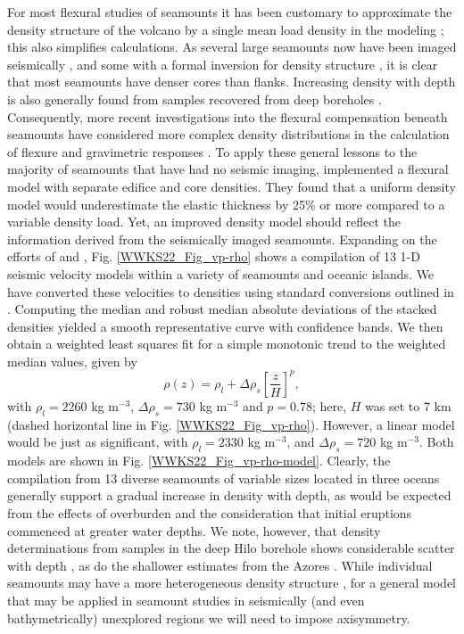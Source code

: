 For most flexural studies of seamounts it has been customary to approximate the density structure of the
volcano by a single mean load density in the modeling \citep[e.g.,~][]{WC74,WSSW06}; this also simplifies calculations.
As several large seamounts now have been imaged seismically \citep[e.g.,~][]{W1985,H1994,C1995,W1997,C1999,W1999,G2001,K2002,EMH05,C2009,W2021},
and some with a formal inversion for density structure \citep[e.g.,~][]{H1991}, it is clear that most seamounts have denser
cores than flanks.  Increasing density with depth is also generally found from samples recovered from deep boreholes
\citep[e.g.,~][]{JM2001,H1979}.
Consequently, more recent investigations into the flexural compensation beneath seamounts have considered more complex
density distributions in the calculation of flexure and gravimetric responses \citep[e.g.,~][]{C2009,W2021}. To apply
these general lessons to the majority of seamounts that have had no seismic imaging, \citet{KW2010} implemented a flexural
model with separate edifice and core densities. They found that a uniform density model would underestimate the elastic thickness
by 25\% or more compared to a variable density load.  Yet, an improved density model should reflect the information derived
from the seismically imaged seamounts.  Expanding on the efforts of \citet{M2001} and \citet{W2021}, Fig. \ref{WWKS22_Fig_vp-rho}
shows a compilation of 13 1-D seismic velocity models within a variety of seamounts and oceanic islands.  We have converted these
velocities to densities using standard conversions outlined in \citet{B2005}. Computing the median and robust median absolute deviations of the
stacked densities yielded a smooth representative curve with confidence bands.  We then obtain a weighted least squares fit for
a simple monotonic trend to the weighted median values, given by
\begin{equation*}
\rho(z) = \rho_l + \Delta \rho_s \left [ \frac{z}{H} \right ]^p,
\end{equation*}
with $\rho_l = 2260$ kg m$^{-3}$, $\Delta \rho_s = 730$ kg m$^{-3}$ and $p = 0.78$; here, $H$ was set to 7 km (dashed
horizontal line in Fig. \ref{WWKS22_Fig_vp-rho}). However, a linear model would be just as significant, with
$\rho_l = 2330$ kg m$^{-3}$, and $\Delta \rho_s = 720$ kg m$^{-3}$. Both models are shown in Fig. \ref{WWKS22_Fig_vp-rho-model}.
Clearly, the compilation from 13 diverse seamounts of variable sizes located in three oceans generally support a gradual
increase in density with depth, as would be expected from the effects of overburden and the consideration that initial
eruptions commenced at greater water depths. We note, however, that density determinations from samples in the deep Hilo
borehole shows considerable scatter with depth \citep{JM2001}, as do the shallower estimates from the Azores \citep{H1979}.
While individual seamounts may have a more heterogeneous density structure \citep[e.g.,~][]{EMH05,H1991}, for a general model
that may be applied in seamount studies in seismically (and even bathymetrically) unexplored regions we will need to impose axisymmetry.

